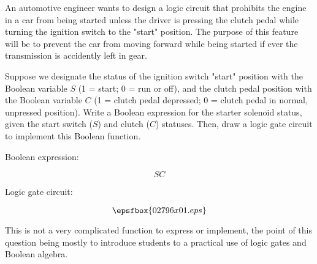 

An automotive engineer wants to design a logic circuit that prohibits the engine in a car from being started unless the driver is pressing the clutch pedal while turning the ignition switch to the "start" position.  The purpose of this feature will be to prevent the car from moving forward while being started if ever the transmission is accidently left in gear.

Suppose we designate the status of the ignition switch "start" position with the Boolean variable $S$ (1 = start; 0 = run or off), and the clutch pedal position with the Boolean variable $C$ (1 = clutch pedal depressed; 0 = clutch pedal in normal, unpressed position).  Write a Boolean expression for the starter solenoid status, given the start switch ($S$) and clutch ($C$) statuses.  Then, draw a logic gate circuit to implement this Boolean function.







Boolean expression:

$$SC$$

Logic gate circuit:

$$\epsfbox{02796x01.eps}$$







This is not a very complicated function to express or implement, the point of this question being mostly to introduce students to a practical use of logic gates and Boolean algebra.




